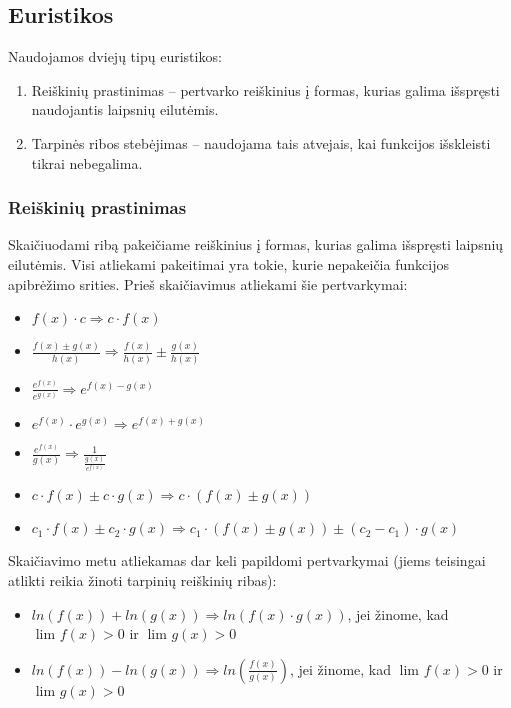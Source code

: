 \subsection{Euristikos}
    Naudojamos dviejų tipų euristikos:
    \begin{enumerate}
        \item Reiškinių prastinimas -- pertvarko reiškinius į formas, kurias galima išspręsti naudojantis laipsnių eilutėmis.
        \item Tarpinės ribos stebėjimas -- naudojama tais atvejais, kai funkcijos išskleisti tikrai nebegalima.
    \end{enumerate}

    \subsubsection{Reiškinių prastinimas}
        Skaičiuodami ribą pakeičiame reiškinius į formas, kurias galima išspręsti laipsnių eilutėmis. Visi atliekami pakeitimai
        yra tokie, kurie nepakeičia funkcijos apibrėžimo srities. Prieš skaičiavimus atliekami šie pertvarkymai:
        \begin{itemize}
            \item $f(x) \cdotp c \Longrightarrow c \cdot f(x)$
            \item $\frac{f(x) \pm g(x)}{h(x)} \Longrightarrow \frac{f(x)}{h(x)} \pm \frac{g(x)}{h(x)}$
            \item $\frac{e^{f(x)}}{e^{g(x)}} \Longrightarrow e^{f(x)-g(x)}$
            \item $e^{f(x)} \cdotp e^{g(x)} \Longrightarrow e^{f(x)+g(x)}$
            \item $\frac{e^{f(x)}}{g(x)} \Longrightarrow \frac{1}{\frac{g(x)}{e^{f(x)}}} $
            \item $c \cdotp f(x) \pm c \cdotp g(x) \Longrightarrow c \cdotp (f(x) \pm g(x))$
            \item $c_1 \cdotp f(x) \pm c_2 \cdotp g(x) \Longrightarrow c_1 \cdotp (f(x) \pm g(x)) \pm (c_2 - c_1) \cdot g(x)$
        \end{itemize}

        Skaičiavimo metu atliekamas dar keli papildomi pertvarkymai (jiems teisingai atlikti reikia žinoti tarpinių
        reiškinių ribas):
        \begin{itemize}
            \item $ln(f(x)) + ln(g(x)) \Longrightarrow ln(f(x) \cdotp g(x))$, jei žinome, kad $\lim_{} f(x) > 0$ ir $\lim_{} g(x) > 0$
            \item $ln(f(x)) - ln(g(x)) \Longrightarrow ln(\frac{f(x)}{g(x)})$, jei žinome, kad $\lim_{} f(x) > 0$ ir $\lim_{} g(x) > 0$
        \end{itemize}

